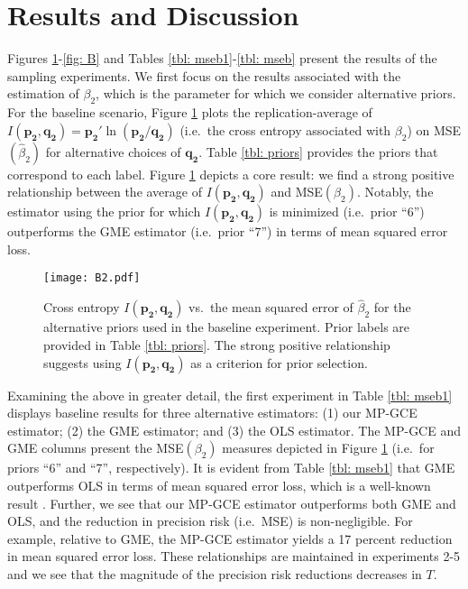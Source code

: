\documentclass{elsarticle}
\begin{document}

\section{Results and Discussion}
\label{sec: results}

Figures \ref{fig: B1}-\ref{fig: B} and Tables \ref{tbl: mseb1}-\ref{tbl: mseb} 
present the results of the sampling experiments.
We first focus on the results associated with the estimation of $\beta_2$, which 
is the parameter for which we consider alternative priors.
For the baseline scenario, Figure \ref{fig: B1} plots the replication-average of 
$I(\mathbf{p_2}, \mathbf{q_2}) = \mathbf{p_2}'\ln (\mathbf{p_2}/
\mathbf{q_2})$ (i.e.\ the cross entropy associated with $\beta_2$) on 
MSE$(\hat{\beta}_2)$  for alternative choices of $\mathbf{q_2}$.
Table \ref{tbl: priors} provides the priors that correspond to each label.
Figure \ref{fig: B1} depicts a core result: we find a strong positive 
relationship between the average of $I(\mathbf{p_2}, \mathbf{q_2})$ 
and MSE$(\beta_2)$.
Notably, the estimator using the prior for which $I(\mathbf{p_2}, 
\mathbf{q_2})$ is minimized (i.e.\ prior ``6'') outperforms the GME 
estimator (i.e.\ prior ``7'') in terms of mean squared error loss.

\begin{figure}[htbp]
\centering
\texttt{[image: B2.pdf]}
\caption{Cross entropy $I(\mathbf{p_2}, \mathbf{q_2})$ vs.\  the mean squared
error of $\hat{\beta}_2$ for the alternative priors used in the baseline experiment.
Prior labels are provided in Table \ref{tbl: priors}.
The strong positive relationship suggests using $I(\mathbf{p_2}, \mathbf{q_2})$
as a criterion for prior selection.}
\label{fig: B1}
\end{figure}

Examining the above in greater detail, the first experiment in Table 
\ref{tbl: mseb1} displays baseline results for three alternative estimators: 
(1) our MP-GCE estimator; (2) the GME estimator; and (3) the OLS 
estimator.
The MP-GCE and GME columns present the MSE$(\beta_2)$ measures 
depicted in Figure \ref{fig: B1} (i.e.\ for priors ``6'' and ``7'', respectively).
It is evident from Table \ref{tbl: mseb1} that GME outperforms OLS in 
terms of mean squared error loss, which is a well-known result 
\citep{golan1996}. 
Further, we see that our MP-GCE estimator outperforms both GME and OLS,
and the reduction in precision risk (i.e.\ MSE) is non-negligible.
For example, relative to GME, the MP-GCE estimator yields a 17 percent 
reduction in mean squared error loss.
These relationships are maintained in experiments 2-5 and we see that 
the magnitude of the precision risk reductions decreases in $T$.
\end{document}
